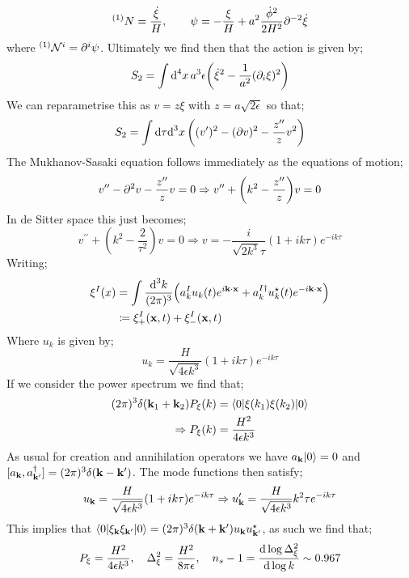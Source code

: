 \begin{equation}
^{(1)}N = \frac{\dot{\xi}}{H}, \qquad \psi = -\frac{\xi}{H} + a^2 \frac{\dot{\phi}^2}{2H^2} \partial^{-2} \dot{\xi}
\end{equation}
where $^{(1)}\mathcal{N}^{i} = \partial^{i} \psi$. Ultimately we find then that the action is given by;
\begin{equation*}
S_{2} = \int{\upd{^4 x} a^{3}\epsilon \left(\dot{\xi}^2 - \frac{1}{a^2}(\del_i \xi)^2\right)}
\end{equation*}
We can reparametrise this as $v = z\xi$ with $z = a\sqrt{2\epsilon}$ so that;
\begin{equation*}
S_{2} = \int{\ud \tau \upd{^3 x}\left((v\pr)^2 - (\del v)^2 - \frac{z^{\prime\prime}}{z}v^2\right)}
\end{equation*}
The Mukhanov-Sasaki equation follows immediately as the equations of motion;
\begin{equation*}
v^{\prime\prime} - \del^2 v - \frac{z^{\prime\prime}}{z}v = 0 \Rightarrow v^{\prime\prime} + \left(k^2 - \frac{z^{\prime\prime}}{z}\right)v = 0
\end{equation*}
In de Sitter space this just becomes;
\begin{equation*}
v^{\prime\prime} + \left(k^2 - \frac{2}{\tau^2}\right)v = 0 \Rightarrow v = -\frac{i}{\sqrt{2k^3}\tau}(1 + ik\tau)e^{-ik\tau}
\end{equation*}
Writing;
\begin{align*}
\xi^{I}(x) &= \int{\frac{\ud^3 k}{(2\pi)^3}\left(a^{I}_k u_k(t)e^{i\vec{k} \cdot \vec{x}} + a^{I\dagger}_k u^{\star}_k(t)e^{-i\vec{k}\cdot \vec{x}}\right)} \\
&\coloneqq \xi_+^{I}(\vec{x}, t) + \xi_-^{I}(\vec{x}, t)
\end{align*}
Where $u_k$ is given by;
\begin{equation*}
u_k = \frac{H}{\sqrt{4\epsilon k^3}}(1 + ik\tau)e^{-ik\tau}
\end{equation*}
If we consider the power spectrum we find that;
\begin{align*}
(2\pi)^3 \delta(\vec{k}_1 + \vec{k}_2) P_\xi(k) &= \bra{0}\xi(k_1)\xi(k_2)\ket{0} \\
\Rightarrow P_\xi(k) &= \frac{H^2}{4\epsilon k^3}
\end{align*}
As usual for creation and annihilation operators we have $a_{\vec{k}}\ket{0} = 0$ and $[a_{\mathbf{k}}, a^{\dagger}_{\mathbf{k}^{\prime}}] = (2\pi)^3\delta(\mathbf{k} - \mathbf{k}^{\prime})$. The mode functions then satisfy;
\begin{equation*}
u_{\mathbf{k}} = \frac{H}{\sqrt{4\epsilon k^3}}(1 + ik\tau)e^{-ik\tau} \Rightarrow u^{\prime}_{\mathbf{k}} = \frac{H}{\sqrt{4\epsilon k^3}}k^2 \tau e^{-ik\tau}
\end{equation*}
This implies that $\bra{0}\xi_{\vec{k}}\xi_{\vec{k}\pr}\ket{0} = (2\pi)^3 \delta(\vec{k} + \vec{k}\pr)u_{\vec{k}}u^{\star}_{\vec{k}\pr}$, as such we find that;
\begin{equation*}
P_{\xi} = \frac{H^2}{4\epsilon k^3}, \quad \Delta_\xi^2 = \frac{H^2}{8\pi\epsilon}, \quad n_s - 1 = \frac{\text{d} \log \Delta_\xi^2}{\text{d} \log k} \sim 0.967
\end{equation*}
